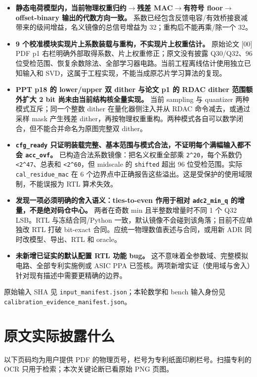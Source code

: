 \documentclass[UTF8,fontset=fandol,10pt,a4paper,openany]{ctexrep}
\newcommand{\code}[1]{\nolinkurl{#1}}
\begin{document}
\begin{itemize}
\item \textbf{静态电荷模型内，当前物理权重归约\ensuremath{\rightarrow}残差 MAC\ensuremath{\rightarrow}有符号 floor\ensuremath{\rightarrow}offset-binary 输出的代数方向一致。} 系数已经包含反馈电容/有效桥接衰减带来的级间增益，名义镜像的总信号增益为 32；重构后不能再乘/除一个 32。
\item \textbf{9 个校准模块实现片上系数装载与重构，不实现片上权重估计。} 原始论文 [00] PDF p1 右栏明确外部取得系数、片上权重修正；原文没有披露 Q30/Q32、96 位受检范围、恢复余数除法、全部学习器电路。当前工程离线估计使用独立已知输入和 SVD，这属于工程实现，不能当成原芯片学习算法的复现。
\item \textbf{PPT p18 的 lower/upper 双 dither 与论文 p1 的 RDAC dither 范围额外扩大 2 bit 尚未由当前结构核全量实现。} 当前 sampling 与 quantizer 两种模式互斥；同一个整数 dither 在量化器侧注入并从 RDAC 命令减去，或通过采样 mask 产生残差 dither，再按物理权重重构。两种模式各自可以数学闭合，但不能合并命名为原图完整双 dither。
\item \textbf{\code{cfg_ready} 只证明装载完整、基本范围与模式合法，不证明每个满幅输入都不会 \code{acc_ovf}。} 已构造合法系数镜像：把名义权重全部乘 \code{2^20}，每个系数仍 \code{<2^47}、总表和 \code{<2^60}，但 midscale 的 \code{shifted} 超出 96 位受检范围。实际 \code{cal_residue_mac} 在 6 个边界点中正确报告这些溢出。这是受保护的使用域限制，不能误报为 RTL 算术失效。
\item \textbf{发现一项必须明确的舍入语义：ties-to-even 作用于相对 \code{adc2_min_q} 的增量，不是绝对码仓中心。} 两者在奇数 min 且半整数增量时不同 1 个 Q32 LSB。RTL 与冻结合同/Python 一致，默认镜像不会碰到该角落；目前不应单独改 RTL 打破 bit-exact 合同。应统一物理数值表述与合同，或用新 ADR 同时改模型、导出、RTL 和 oracle。
\item \textbf{未新增已证实的默认配置 RTL 功能 bug。} 这不意味着全参数域、完整模拟电路、全部专利实施例或 ASIC PPA 已签核。两项新增实证（使用域与舍入）针对现有描述中需要更精确的边界。
\end{itemize}


原始输入 SHA 见 \code{input_manifest.json}；本轮数学和 bench 输入身份见 \code{calibration_evidence_manifest.json}。


\section{原文实际披露什么}


以下页码均为用户提供 PDF 的物理页号，栏号为专利纸面印刷栏号。扫描专利的 OCR 只用于检索；本次关键论断已看原始 PNG 页图。
\end{document}
